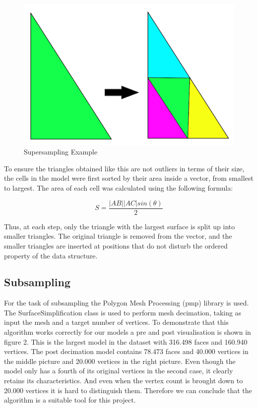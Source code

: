 \documentclass{bigdata}
\begin{document}
\begin{figure}[h!]
  \centering
  \includegraphics[width=0.5\linewidth]{Pictures/triangle.png}
  \caption{Supersampling Example}
\end{figure}

To ensure the triangles obtained like this are not outliers in terms of their size, the cells in the model were first sorted by their area inside a vector, from smallest to largest. The area of each cell was calculated using the following formula:

\begin{equation}
S = \frac{|AB||AC|sin(\theta)}{2}
\end{equation}

Thus, at each step, only the triangle with the largest surface is split up into smaller triangles. The original triangle is removed from the vector, and the smaller triangles are inserted at positions that do not disturb the ordered property of the data structure.

\subsection{Subsampling}
For the task of subsampling the Polygon Mesh Processing (pmp) library is used. The SurfaceSimplification class is used to perform mesh decimation, taking as input the mesh and a target number of vertices. To demonstrate that this algorithm works correctly for our models a pre and post visualisation is shown in figure 2. This is the largest model in the dataset with 316.498 faces and 160.940 vertices. The post decimation model contains 78.473 faces and 40.000 vertices in the middle picture and 20.000 vertices in the right picture. Even though the model only has a fourth of its original vertices in the second case, it clearly retains its characteristics. And even when the vertex count is brought down to 20.000 vertices it is hard to distinguish them. Therefore we can conclude that the algorithm is a suitable tool for this project.
\end{document}
